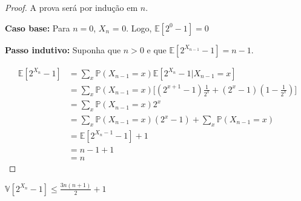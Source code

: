 \begin{proof}
A prova será por indução em $n$. 

\textbf{Caso base:} Para $n = 0$, $X_n$ = 0. Logo, $\mathbb{E}[2^0 - 1] = 0$

\textbf{Passo indutivo:} Suponha que $n > 0$ e que $\mathbb{E}[2^{X_{n-1}} - 1] = n-1$.

\begin{align*}
  \mathbb{E}[2^{X_n} - 1] 
    &= \sum_{x} \mathbb{P} (X_{n-1} = x) \mathbb{E}[2^{X_n} - 1 | X_{n-1} = x] \\
    &= \sum_{x} \mathbb{P} (X_{n-1} = x) \Big[ (2^{x+1} - 1) \frac{1}{2^x} +  (2^x - 1) (1 - \frac{1}{2^x}) \Big] \\
    &= \sum_{x} \mathbb{P} (X_{n-1} = x) 2^x \\
    &= \sum_{x} \mathbb{P} (X_{n-1} = x) (2^x - 1) + \sum_{x} \mathbb{P} (X_{n-1} = x) \\
    &= \mathbb{E}[2^{X_n-1} - 1] + 1 \\
    &= n - 1 + 1 \\
    &= n
\end{align*}

\end{proof}

\begin{lemma}
$\mathbb{V}[2^{X_n} - 1] \leq \frac{3n(n+1)}{2} + 1$
\end{lemma}

